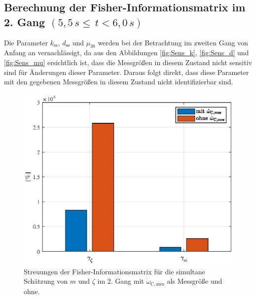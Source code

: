 \subsection{Berechnung der Fisher-Informationsmatrix im 2. Gang $(5,5\, s\leq\, t<6,0\, s )$}
Die Parameter $k_\mathrm{ss}$, $d_\mathrm{ss}$ und $\mu_{38}$ werden bei der Betrachtung im zweiten Gang von Anfang an vernachlässigt, da aus den Abbildungen \ref{fig:Sens_k}, \ref{fig:Sens_d} und \ref{fig:Sens_mu} ersichtlich ist, dass die Messgrößen in diesem Zustand nicht sensitiv sind für Änderungen dieser Parameter. Daraus folgt direkt, dass diese Parameter mit den gegebenen Messgrößen in diesem Zustand nicht identifizierbar sind.

\begin{figure}[ht]
  \centering
 \includegraphics[scale=0.9]{figures/03_Sensitivitaetsanalyse/03_Fisher_Info/Gang2/m_vs_zeta.eps}
  \caption{Streuungen der Fisher-Informationsmatrix für die simultane Schätzung von $m$ und $\zeta$ im 2. Gang mit $\dot{\omega}_\mathrm{C,mes}$ als Messgröße und ohne.}
\end{figure} 

